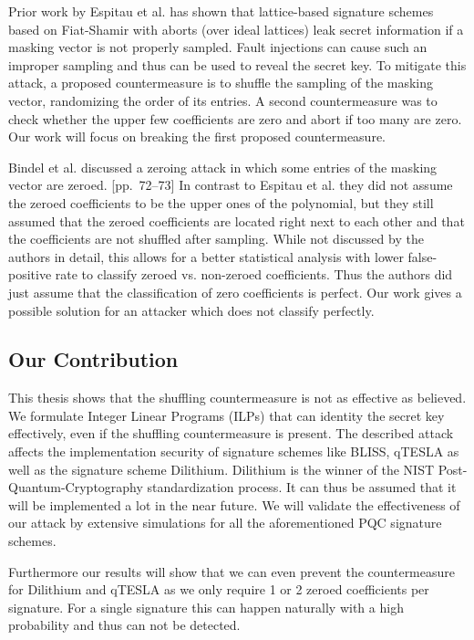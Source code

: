 \documentclass[a4paper,titlepage]{article}
\begin{document}
Prior work by Espitau et al. \cite{espitau} has shown that lattice-based signature schemes based on Fiat-Shamir with aborts (over ideal lattices) leak secret information if a masking vector is not properly sampled. Fault injections can cause such an improper sampling and thus can be used to reveal the secret key. To mitigate this attack, a proposed countermeasure is to shuffle the sampling of the masking vector, randomizing the order of its entries. A second countermeasure was to check whether the upper few coefficients are zero and abort if too many are zero. Our work will focus on breaking the first proposed countermeasure.

Bindel et al. discussed a zeroing attack in which some entries of the masking vector are zeroed. \cite{sensitivity}[pp.~72--73]
In contrast to Espitau et al. \cite{espitau} they did not assume the zeroed coefficients to be the upper ones of the polynomial, but they still assumed that the zeroed coefficients are located right next to each other and that the coefficients are not shuffled after sampling.
While not discussed by the authors in detail, this allows for a better statistical analysis with lower false-positive rate to classify zeroed vs. non-zeroed coefficients.
Thus the authors did just assume that the classification of zero coefficients is perfect. Our work gives a possible solution for an attacker which does not classify perfectly.

\subsection{Our Contribution}
This thesis shows that the shuffling countermeasure is not as effective as believed. We formulate Integer Linear Programs (ILPs) that can identity the secret key effectively, even if the shuffling countermeasure is present. The described attack affects the implementation security of signature schemes like BLISS, qTESLA as well as the signature scheme Dilithium.
Dilithium is the winner of the NIST Post-Quantum-Cryptography standardization process. \cite{niststatus} It can thus be assumed that it will be implemented a lot in the near future.
We will validate the effectiveness of our attack by extensive simulations for all the aforementioned PQC signature schemes.

Furthermore our results will show that we can even prevent the  countermeasure for Dilithium and qTESLA as we only require 1 or 2 zeroed coefficients per signature. For a single signature this can happen naturally with a high probability and thus can not be detected.
\end{document}

